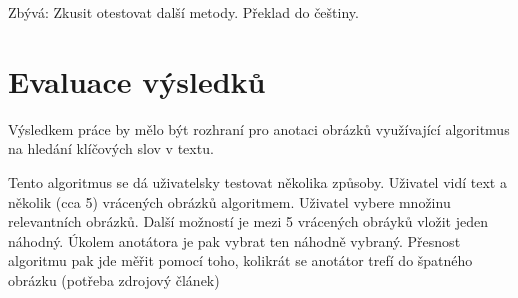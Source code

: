 Zbývá: Zkusit otestovat další metody. Překlad do češtiny.

\section{Evaluace výsledků}

Výsledkem práce by mělo být rozhraní pro anotaci obrázků využívající algoritmus na hledání klíčových slov v textu.

Tento algoritmus se dá uživatelsky testovat několika způsoby. Uživatel vidí text a několik (cca 5) vrácených obrázků algoritmem. Uživatel vybere množinu relevantních obrázků. Další možností je mezi 5 vrácených obráyků vložit jeden náhodný. Úkolem anotátora je pak vybrat ten náhodně vybraný. Přesnost algoritmu pak jde měřit pomocí toho, kolikrát se anotátor trefí do špatného obrázku (potřeba zdrojový článek)




